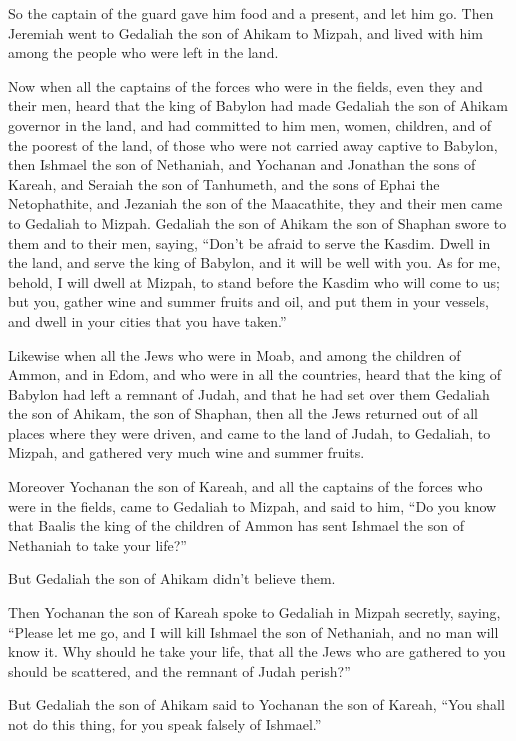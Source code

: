 So the captain of the guard gave him food and a present, and let him go. \myverse{}Then Jeremiah went to Gedaliah the son of Ahikam to Mizpah, and lived with him among the people who were left in the land.


\myverse{}Now when all the captains of the forces who were in the fields,
even they and their men, heard that the king of Babylon had made Gedaliah the son of Ahikam governor in the land, and had committed to him men, women, children, and of the poorest of the land, of those who were not carried away captive to Babylon, \myverse{}then Ishmael the son of Nethaniah, and Yochanan and Jonathan the sons of Kareah, and Seraiah the son of Tanhumeth, and the sons of Ephai the Netophathite, and Jezaniah the son of the Maacathite, they and their men came to Gedaliah to Mizpah. \myverse{}Gedaliah the son of Ahikam the son of Shaphan swore to them and to their men, saying, “Don’t be afraid to serve the Kasdim. Dwell in the land, and serve the king of Babylon, and it will be well with you. \myverse{}As for me, behold, I will dwell at Mizpah, to stand before the Kasdim who will come to us; but you, gather wine and summer fruits and oil, and put them in your vessels, and dwell in your cities that you have taken.”


\myverse{}Likewise when all the Jews who were in Moab, and among the children of Ammon, and in Edom, and who were in all the countries, heard that the king of Babylon had left a remnant of Judah, and that he had set over them Gedaliah the son of Ahikam, the son of Shaphan, \myverse{}then all the Jews returned out of all places where they were driven, and came to the land of Judah, to Gedaliah, to Mizpah, and gathered very much wine and summer fruits.


\myverse{}Moreover Yochanan the son of Kareah, and all the captains of the forces who were in the fields, came to Gedaliah to Mizpah, \myverse{}and said to him, “Do you know that Baalis the king of the children of Ammon has sent Ishmael the son of Nethaniah to take your life?”

But Gedaliah the son of Ahikam didn’t believe them.


\myverse{}Then Yochanan the son of Kareah spoke to Gedaliah in Mizpah secretly, saying, “Please let me go, and I will kill Ishmael the son of Nethaniah, and no man will know it. Why should he take your life, that all the Jews who are gathered to you should be scattered, and the remnant of Judah perish?”


\myverse{}But Gedaliah the son of Ahikam said to Yochanan the son of Kareah,
“You shall not do this thing, for you speak falsely of Ishmael.”


